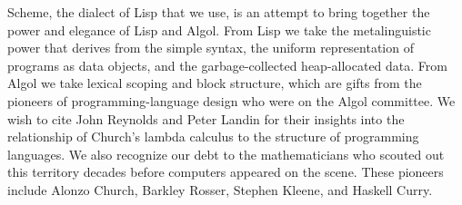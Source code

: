 Scheme, the dialect of Lisp that we use,
is an attempt to bring together the power and elegance of Lisp and Algol.
From Lisp we take the metalinguistic power that derives from
the simple syntax,
the uniform representation of programs as data objects,
and the garbage-collected heap-allocated data.
From Algol we take lexical scoping and block structure,
which are gifts from the pioneers of programming-language design who were on the Algol committee.
We wish to cite John Reynolds and Peter Landin for their insights into
the relationship of Church's lambda calculus to the structure of programming languages.
We also recognize our debt to the mathematicians
who scouted out this territory decades before computers appeared on the scene.
These pioneers include Alonzo Church, Barkley Rosser, Stephen Kleene, and Haskell Curry.
